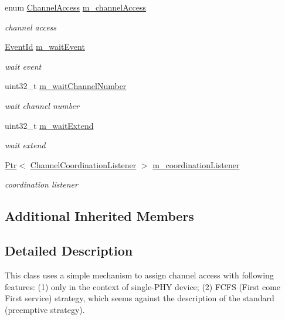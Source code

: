 \begin{DoxyCompactItemize}
enum \hyperlink{namespacens3_a877f2f8d3767cc34993bce0739179781}{Channel\+Access} \hyperlink{classns3_1_1DefaultChannelScheduler_a1316c42b27cfd480a0a2bf4f949f0402}{m\+\_\+channel\+Access}
\begin{DoxyCompactList}\small\item\em channel access \end{DoxyCompactList}\item 
\hyperlink{classns3_1_1EventId}{Event\+Id} \hyperlink{classns3_1_1DefaultChannelScheduler_a82768fbbb4fc84cdffefb0a2b1595ace}{m\+\_\+wait\+Event}
\begin{DoxyCompactList}\small\item\em wait event \end{DoxyCompactList}\item 
uint32\+\_\+t \hyperlink{classns3_1_1DefaultChannelScheduler_ae6bec77b7f234762faeee0370224e259}{m\+\_\+wait\+Channel\+Number}
\begin{DoxyCompactList}\small\item\em wait channel number \end{DoxyCompactList}\item 
uint32\+\_\+t \hyperlink{classns3_1_1DefaultChannelScheduler_ae8e867c65532f6c7e2db6abba1b29d87}{m\+\_\+wait\+Extend}
\begin{DoxyCompactList}\small\item\em wait extend \end{DoxyCompactList}\item 
\hyperlink{classns3_1_1Ptr}{Ptr}$<$ \hyperlink{classns3_1_1ChannelCoordinationListener}{Channel\+Coordination\+Listener} $>$ \hyperlink{classns3_1_1DefaultChannelScheduler_aee8f7f9aa74f12f31bc7338508a1c8da}{m\+\_\+coordination\+Listener}
\begin{DoxyCompactList}\small\item\em coordination listener \end{DoxyCompactList}\end{DoxyCompactItemize}
\subsection*{Additional Inherited Members}


\subsection{Detailed Description}
This class uses a simple mechanism to assign channel access with following features\+: (1) only in the context of single-\/\+P\+HY device; (2) F\+C\+FS (First come First service) strategy, which seems against the description of the standard (preemptive strategy). 

